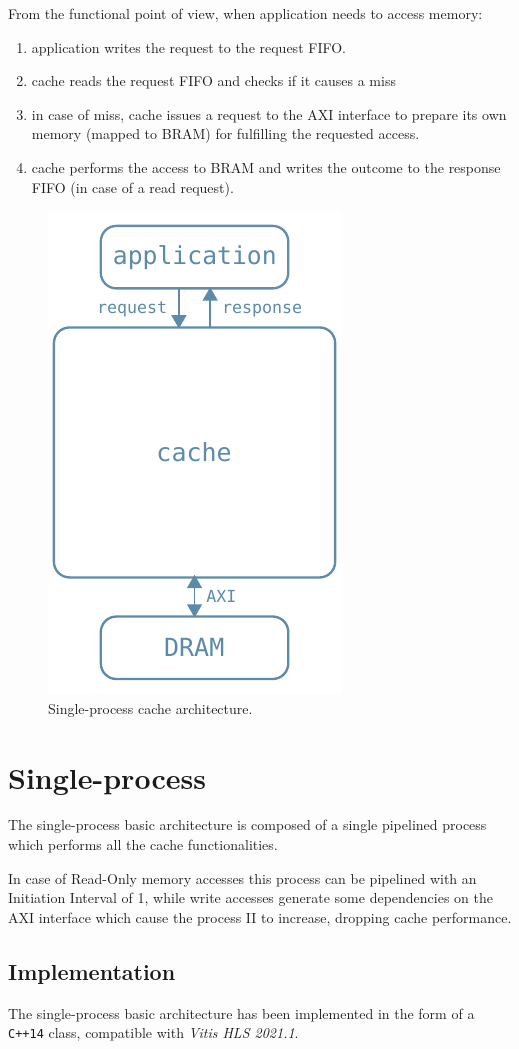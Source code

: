 \documentclass[11pt,a4paper]{memoir}
\begin{document}
\bigskip
From the functional point of view, when application needs to access memory:
\begin{enumerate}
	\item application writes the request to the request FIFO.
	\item cache reads the request FIFO and checks if it causes a miss
	\item in case of miss, cache issues a request to the AXI interface to
		prepare its own memory (mapped to BRAM) for fulfilling the
		requested access.
	\item cache performs the access to BRAM and writes the outcome to the
		response FIFO (in case of a read request).
\end{enumerate}

\begin{figure}
	\centering
	\includegraphics[width=.3\textwidth]{basic_arch}
	\caption{Single-process cache architecture.}
	\label{fig:basic_arch}
\end{figure}

\section{Single-process}
The single-process basic architecture is composed of a single pipelined process
which performs all the cache functionalities.

In case of Read-Only memory accesses this process can be pipelined with an
Initiation Interval of 1, while write accesses generate some dependencies on the
AXI interface which cause the process II to increase, dropping cache
performance.

\subsection{Implementation}
The single-process basic architecture has been implemented in the form of a
\texttt{C++14} class, compatible with \emph{Vitis HLS 2021.1}.
\end{document}
